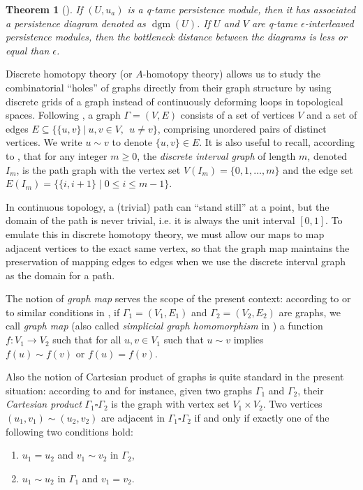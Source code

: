 \documentclass{amsart}
\DeclareMathOperator{\dgm}{dgm}
\newtheorem{theorem}{Theorem}[section]
\begin{document}
\begin{theorem}[{\cite[Theorem~2.3]{chazal2014persistence_geom}}]
If $(U, u_a)$ is a q-tame persistence module, then it has associated a persistence diagram denoted as $\dgm(U)$. If $U$ and $V$ are q-tame $\epsilon$-interleaved persistence modules, then the bottleneck distance between the diagrams is less or equal than $\epsilon$.
\end{theorem}

Discrete homotopy theory (or $A$-homotopy theory) allows us to study the combinatorial ``holes'' of graphs directly from their graph structure by using discrete grids of a graph instead of continuously deforming loops in topological spaces. Following \cite[Definition~1.1]{kapulkin_grupoid}, a graph $\Gamma = (V, E)$ consists of a set of vertices $V$ and a set of edges $E \subseteq \{\{u,v\} \ | \ u,v \in V, \ \ u \neq v\}$, comprising unordered pairs of distinct vertices. We write $u \sim v$ to denote $\{u, v\} \in E$. It is also useful to recall, according to \cite[Example~1.3(1)]{kapulkin_grupoid},  that for any integer $m \ge 0$, the \textit{discrete interval graph} of length $m$, denoted $I_m$, is the path graph with the vertex set $V(I_m) = \{0, 1, \dots, m\}$ and the edge set $E(I_m) = \{\{i, i+1\} \mid 0 \le i \le m-1\}$. 

In continuous topology, a (trivial) path can ``stand still'' at a point, but the domain of the path is never trivial, i.e. it is always the unit interval $[0,1]$. To emulate this in discrete homotopy theory, we must allow our maps to map adjacent vertices to the exact same vertex, so that the graph map maintains the preservation of mapping edges to edges when we use the discrete interval graph as the domain for a path.

The notion of \textit{graph map} serves the scope of the present context: according to \cite[Definition~1.2]{kapulkin_grupoid} or to similar conditions in \cite{barusp}, if $\Gamma_1=(V_1,E_1)$ and $\Gamma_2=(V_2,E_2)$ are graphs, we call  \textit{graph map} (also called  \textit{simplicial graph homomorphism} in \cite[Definition~2.1(2)]{Babson2006})  a function $f : V_1 \to V_2$ such that for all $u, v \in V_1$ such that $u \sim v$ implies $f(u) \sim f(v) \text{ or } f(u) = f(v).$

Also the notion of Cartesian  product of graphs is quite standard in the present situation: according to \cite[Definition~1.6]{kapulkin_grupoid} and \cite{badadoru, barusp} for instance, 
given two graphs $\Gamma_1$ and $\Gamma_2$, their \textit{Cartesian product} $\Gamma_1 \square \Gamma_2$ is the graph with vertex set $V_1 \times V_2$. Two vertices $(u_1, v_1) \sim (u_2, v_2)$ are adjacent in $\Gamma_1 \square \Gamma_2$ if and only if exactly one of the following two conditions hold:
\begin{enumerate}
    \item[{\rm (i).}] $u_1 = u_2$ and $v_1 \sim v_2$ in $\Gamma_2$,
    \item[{\rm (ii).}] $u_1 \sim u_2$ in $\Gamma_1$ and $v_1 = v_2$.
\end{enumerate}
\end{document}
